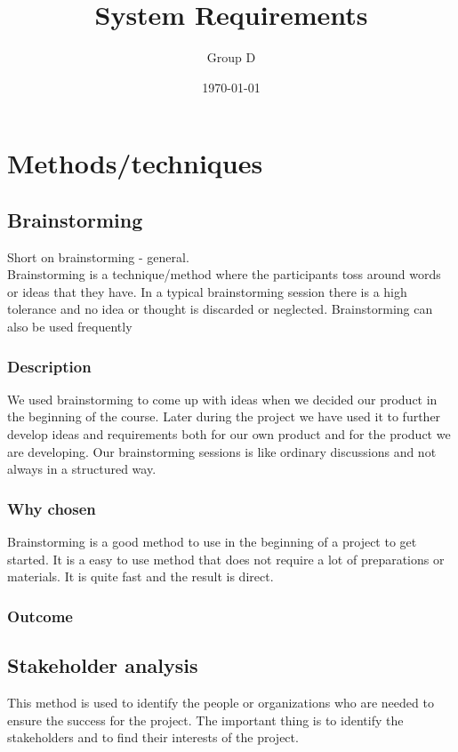 \documentclass[a4paper]{article}
\title{System Requirements}
\author{Group D}
\date{\today}
\begin{document}
  \tableofcontents

  \section{Methods/techniques}
  \subsection{Brainstorming}
  Short on brainstorming - general. \\
  Brainstorming is a technique/method where the participants toss around words or ideas that they have. In a typical brainstorming session there is a high tolerance and no idea or thought is discarded or neglected. Brainstorming can also be used frequently 
    \subsubsection{Description}
    We used brainstorming to come up with ideas when we decided our product in the beginning of the course. Later during the project we have used it to further develop ideas and requirements both for our own product and for the product we are developing. Our brainstorming sessions is like ordinary discussions and not always in a structured way.
    \subsubsection{Why chosen}

    Brainstorming is a good method to use in the beginning of a project to get started. It is a easy to use method that does not require a lot of preparations or materials. It is quite fast and the result is direct. 

    \subsubsection{Outcome}
    
    \subsection{Stakeholder analysis}
        This method is used to identify the people or organizations who are needed to ensure the success for the project. The important thing is to identify the stakeholders and to find their interests of the project. 
\end{document}
